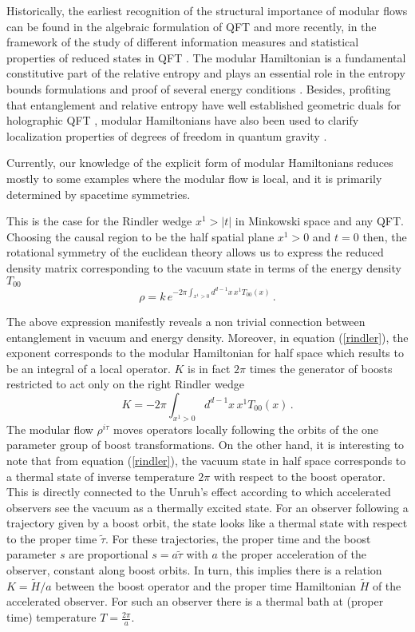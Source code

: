 \documentclass[12pt,a4paper]{article}
\newcommand{\be}{\begin{equation}}
\newcommand{\ee}{\end{equation}}
\def\be{\begin{equation}}
\def\ee{\end{equation}}
\begin{document}
Historically, the earliest recognition of the structural importance of modular flows can be found in the algebraic formulation of QFT \cite{brunetti1993modular,Hislop:1981uh} and more recently, in the framework of the study of different information measures and statistical properties of reduced states in QFT \cite{Casini:2017roe,Arias:2017dda, ohya2004quantum}. The modular Hamiltonian is a fundamental constitutive part of the relative entropy and plays an essential role in the entropy bounds formulations and proof of several energy conditions \cite{Casini:2008cr,Wall:2011hj,Blanco:2013lea,Bousso:2014uxa,Bousso:2015wca,Hollands:2018wzi}.
Besides, profiting that entanglement and relative entropy have well established geometric duals for holographic QFT \cite{Ryu:2006bv,Ryu:2006ef, Jafferis:2015del}, modular Hamiltonians have also been used to clarify localization properties of degrees of freedom in quantum gravity \cite{Blanco:2013joa,Jafferis:2014lza,Faulkner:2017vdd}.

Currently, our knowledge of the explicit form of modular Hamiltonians reduces mostly to some examples where the modular flow is local, and it is primarily determined by spacetime symmetries. 

This is the case for the Rindler wedge $x^1>\vert t \vert$ in Minkowski space and any QFT. Choosing the causal region to be the half spatial plane $x^1>0$ and $t=0$ then, the rotational symmetry of the euclidean theory allows us to express the reduced density matrix corresponding to the vacuum state in terms of the energy density $T_{00}$
\be
\rho = k\, e^{-2\pi \int_{x^1>0}d^{d-1}x\,x^1 T_{00}(x)}\,.
\label{rindler}
\ee

The above expression manifestly reveals a non trivial connection between entanglement in vacuum and energy density.
Moreover, in equation (\ref{rindler}), the exponent corresponds to the modular Hamiltonian for half space which results to be an integral of a local operator. $K$ is in fact $2\pi$ times the generator of boosts restricted to act only on the right Rindler wedge
\be
K=-2\pi \int_{x^1>0}d^{d-1}x\,x^1 T_{00}(x)\,.
\ee
The modular flow $\rho^{i\tau}$ moves operators locally following the orbits of the one parameter group of boost transformations.
On the other hand, it is interesting to note that from equation (\ref{rindler}), the vacuum state in half space corresponds to a thermal state of inverse temperature $2\pi$ with respect to the boost operator. 
This is directly connected to the Unruh's effect \cite{unruh1976notes} according to which accelerated observers see the vacuum as a thermally excited state.
For an observer following a trajectory given by a boost orbit, the state looks like a thermal state with respect to the proper time $\tilde{\tau}$. For these trajectories, the proper time and the boost parameter $s$ are proportional $s=a \tilde{\tau}$ with $a$ the proper acceleration of the observer, constant along boost orbits. In turn, this implies there is a relation $K= \tilde{H}/a$ between the boost operator and the proper time Hamiltonian $\tilde{H}$ of the accelerated observer. For such an observer there is a thermal bath at (proper time) temperature $T=\frac{2\pi}{a}$.
\end{document}
